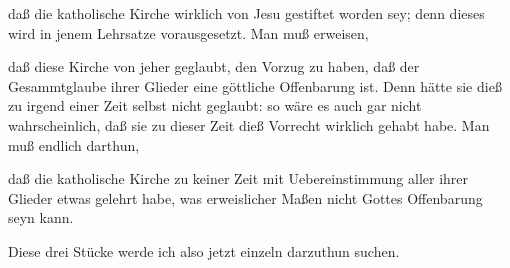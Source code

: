 \begin{aufza}
\begin{aufzb}
\item daß die katholische Kirche wirklich von Jesu gestiftet worden sey; denn dieses wird in jenem Lehrsatze vorausgesetzt. Man muß erweisen,
\item daß diese Kirche von jeher geglaubt, den Vorzug zu haben, daß der Gesammtglaube ihrer Glieder eine göttliche Offenbarung ist. Denn hätte sie dieß zu irgend einer Zeit selbst nicht geglaubt: so wäre es auch gar nicht wahrscheinlich, daß sie zu dieser Zeit dieß Vorrecht wirklich gehabt habe. Man muß endlich darthun,
\item daß die katholische Kirche zu keiner Zeit mit Uebereinstimmung aller ihrer Glieder etwas gelehrt habe, was erweislicher Maßen nicht Gottes Offenbarung seyn kann.
\end{aufzb}
\end{aufza}
Diese drei Stücke werde ich also jetzt einzeln darzuthun suchen.~



